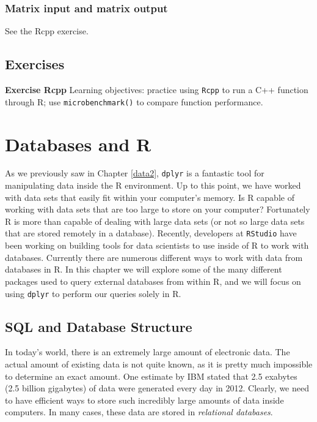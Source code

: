 \documentclass[
]{krantz}
\begin{document}
\hypertarget{matrix-input-and-matrix-output}{%
\subsection{Matrix input and matrix output}\label{matrix-input-and-matrix-output}}

See the Rcpp exercise.

\hypertarget{exercises-9}{%
\section{Exercises}\label{exercises-9}}

\textbf{Exercise Rcpp} Learning objectives: practice using \texttt{Rcpp} to run a C++ function through R; use \texttt{microbenchmark()} to compare function performance.

\hypertarget{databases-and-r}{%
\chapter{Databases and R}\label{databases-and-r}}

As we previously saw in Chapter \ref{data2}, \texttt{dplyr} is a fantastic tool for manipulating data inside the R environment. Up to this point, we have worked with data sets that easily fit within your computer's memory. Is R capable of working with data sets that are too large to store on your computer? Fortunately R is more than capable of dealing with large data sets (or not so large data sets that are stored remotely in a database). Recently, developers at \texttt{RStudio} have been working on building tools for data scientists to use inside of R to work with databases. Currently there are numerous different ways to work with data from databases in R. In this chapter we will explore some of the many different packages used to query external databases from within R, and we will focus on using \texttt{dplyr} to perform our queries solely in R.

\hypertarget{sql-and-database-structure}{%
\section{SQL and Database Structure}\label{sql-and-database-structure}}

In today's world, there is an extremely large amount of electronic data. The actual amount of existing data is not quite known, as it is pretty much impossible to determine an exact amount. One estimate by IBM stated that 2.5 exabytes (2.5 billion gigabytes) of data were generated every day in 2012. Clearly, we need to have efficient ways to store such incredibly large amounts of data inside computers. In many cases, these data are stored in \emph{relational databases}.
\end{document}

